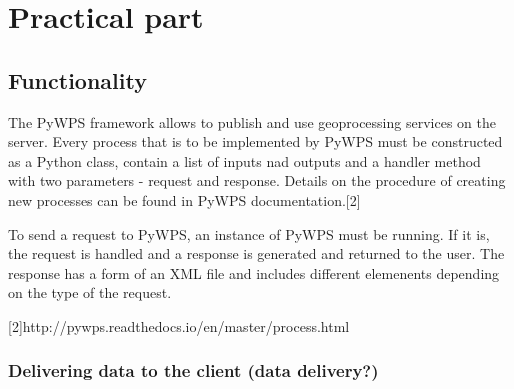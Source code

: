\chapter{Practical part}
\label{4-practical}

\section{Functionality} 

The PyWPS framework allows to publish and use geoprocessing services on the server. Every process that is to be implemented by PyWPS must be constructed as a Python class, contain a list of inputs nad outputs and a handler method with two parameters - request and response. Details on the procedure of creating new processes can be found in PyWPS documentation.[2]

To send a request to PyWPS, an instance of PyWPS must be running. If it is, the request is handled and a response is generated and returned to the user. The response has a form of an XML file and includes different elemenents depending on the type of the request.


[2]http://pywps.readthedocs.io/en/master/process.html


\subsection{Delivering data to the client (data delivery?)}




